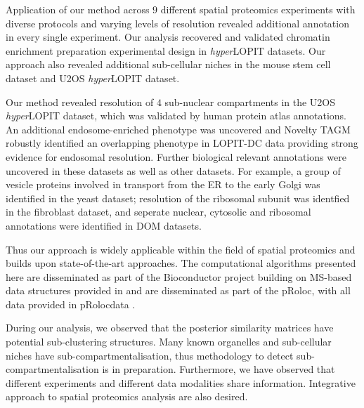 \documentclass[12pt,english]{article}
\begin{document}
Application of our method across $9$ different spatial proteomics experiments with diverse protocols and varying levels of resolution revealed additional annotation in every single experiment. Our analysis recovered and validated chromatin enrichment preparation experimental design in \textit{hyper}LOPIT datasets. Our approach also revealed additional sub-cellular niches in the mouse stem cell dataset and U2OS \textit{hyper}LOPIT dataset.

Our method revealed resolution of $4$ sub-nuclear compartments in the U2OS \textit{hyper}LOPIT dataset, which was validated by human protein atlas annotations. An additional endosome-enriched phenotype was uncovered and Novelty TAGM robustly identified an overlapping phenotype in LOPIT-DC data providing strong evidence for endosomal resolution. Further biological relevant annotations were uncovered in these datasets as well as other datasets. For example, a group of vesicle proteins involved in transport from the ER to the early Golgi was identified in the yeast dataset; resolution of the ribosomal subunit was identfied in the fibroblast dataset, and seperate nuclear, cytosolic and ribosomal annotations were identified in DOM datasets.

Thus our approach is widely applicable within the field of spatial proteomics and builds upon state-of-the-art approaches. The computational algorithms presented here are disseminated as part of the Bioconductor project \citep{Bioconductor::2004, Huber:2015} building on MS-based data structures provided in \cite{MSnbase:2012} and are disseminated as part of the pRoloc, with all data provided in pRolocdata \citep{pRoloc:2014}.

During our analysis, we observed that the posterior similarity matrices have potential sub-clustering structures. Many known organelles and sub-cellular niches have sub-compartmentalisation, thus methodology to detect sub-compartmentalisation is in preparation. Furthermore, we have observed that different experiments and different data modalities share information. Integrative approach to spatial proteomics analysis are also desired. 

\appendix

\clearpage


\end{document}
